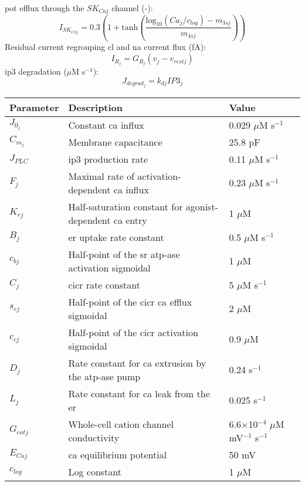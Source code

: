 \documentclass[11pt]{elsarticle}
\newcommand{\mus}{$\mu$M s$^{-1}$\xspace}
\newcommand{\uM}{$\mu$M\xspace}
\newcommand{\n}{$^{-1}$\xspace}
\newcommand{\psec}{s$^{-1}$\xspace}
\newcommand{\na}{\gls{na}\xspace}
\newcommand{\pot}{\gls{pot}\xspace}
\newcommand{\cl}{\gls{cl}\xspace}
\newcommand{\ca}{\gls{ca}\xspace}
\newcommand{\ip}{\gls{ip3}\xspace}
\begin{document}
%
\pot efflux through the $SK_{Caj}$ channel (-):
\begin{equation} \label{eq:JSKCaj}
I_{SK_{Caj}} = 0.3\left( 1+ \mathrm{tanh}  \left(  \frac{   \mathrm{log}_{10} (Ca_j/c_{log}) -m_{3sj}  } {m_{4sj}}  \right)      \right) 
\end{equation}
%
Residual current regrouping \cl and \na current flux (fA):
\begin{equation} \label{eq:JRj}
I_{R_{j}} = G_{R_{j}} ( v_{j} - v_{rest j}  )
\end{equation}
%
\ip degradation (\mus):  
\begin{equation} \label{eq:Jdegradj}
J_{degrad_{j}}= k_{dj} IP3_{j}
\end{equation}
%
\begin{longtable}[h!]{ p{0.12\linewidth}   p{0.6\linewidth}   p{0.28\linewidth} }
	\hline
	Parameter & Description & Value \\
	\hline
$J_{0_{j}}$ 			& Constant \ca influx & 0.029 \mus \\
$C_{m_{j}}$				& Membrane capacitance												& 25.8  pF \\
$ J_{PLC} $  & \ip production rate & 0.11 \mus  \\
$F_{j}$      			& Maximal rate of activation-dependent \ca influx			& 0.23 \mus			 \\
$K_{rj}$				& Half-saturation constant for agonist-dependent \ca entry	& 1 \uM	 \\
$B_{j}$      			& \gls{er} uptake rate constant							& 0.5 \mus	 \\
$c_{bj}$				& Half-point of the \gls{sr} \gls{atp}-ase activation sigmoidal 	& 1  \uM	 \\
$C_{j}$      			& \gls{cicr} rate constant									& 5 \mus \\
$s_{cj}$				& Half-point of the \gls{cicr} \ca efflux sigmoidal			& 2  \uM \\
$c_{cj}$				& Half-point of the \gls{cicr} activation sigmoidal			& 0.9 \uM \\
$D_{j}$      			& Rate constant for \ca extrusion by the \gls{atp}-ase pump		 & 0.24	\psec	\\
$L_{j}$      			& Rate constant for \ca leak from the \gls{er} 		 & 0.025	\psec \\
$G_{cat j}$      		& Whole-cell cation channel conductivity	& 6.6$\times$10$^{-4}$ \uM mV\n \psec	 \\
$E_{Caj}$      			& \ca equilibrium potential								 	& 50 mV	 \\
$c_{log}$				& Log constant & 1 \uM \\

\end{longtable}
\end{document}
